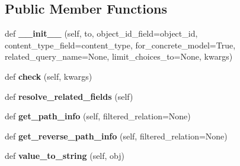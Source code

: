 \subsection*{Public Member Functions}
\begin{DoxyCompactItemize}
\item 
\mbox{\label{classdjango_1_1contrib_1_1contenttypes_1_1fields_1_1_generic_relation_a7842498bbd34c38add44d360b27bd8e9}} 
def {\bfseries \+\_\+\+\_\+init\+\_\+\+\_\+} (self, to, object\+\_\+id\+\_\+field=\textquotesingle{}object\+\_\+id\textquotesingle{}, content\+\_\+type\+\_\+field=\textquotesingle{}content\+\_\+type\textquotesingle{}, for\+\_\+concrete\+\_\+model=True, related\+\_\+query\+\_\+name=None, limit\+\_\+choices\+\_\+to=None, kwargs)
\item 
\mbox{\label{classdjango_1_1contrib_1_1contenttypes_1_1fields_1_1_generic_relation_a8d39cbb17590612c138c5d27deb594d1}} 
def {\bfseries check} (self, kwargs)
\item 
\mbox{\label{classdjango_1_1contrib_1_1contenttypes_1_1fields_1_1_generic_relation_a9272cf8c7f5709604ab876b945d35c85}} 
def {\bfseries resolve\+\_\+related\+\_\+fields} (self)
\item 
\mbox{\label{classdjango_1_1contrib_1_1contenttypes_1_1fields_1_1_generic_relation_a56b05703b7d5ca47979535c182942078}} 
def {\bfseries get\+\_\+path\+\_\+info} (self, filtered\+\_\+relation=None)
\item 
\mbox{\label{classdjango_1_1contrib_1_1contenttypes_1_1fields_1_1_generic_relation_a05689dde3ba83c69e4c2938b36bbf74c}} 
def {\bfseries get\+\_\+reverse\+\_\+path\+\_\+info} (self, filtered\+\_\+relation=None)
\item 
\mbox{\label{classdjango_1_1contrib_1_1contenttypes_1_1fields_1_1_generic_relation_a6a5d02b921775633a7b44887aa5add87}} 
def {\bfseries value\+\_\+to\+\_\+string} (self, obj)

\end{DoxyCompactItemize}
